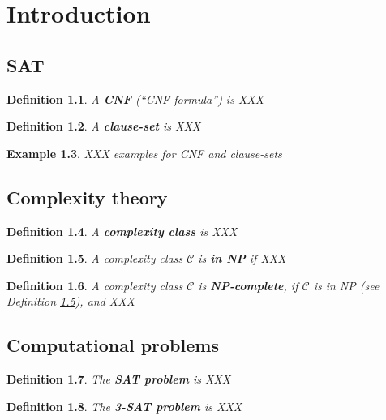 \documentclass[a4paper]{report}
\newtheorem{defi}{Definition}[section]
\newtheorem{examp}[defi]{Example}
\begin{document}
\chapter{Introduction}
\label{cha:Introduction}

\section{SAT}
\label{sec:BackgroundSAT}

\begin{defi}\label{def:CNF}
  A \textbf{CNF} (``CNF formula'') is XXX
\end{defi}

\begin{defi}\label{def:CLS}
  A \textbf{clause-set} is XXX
\end{defi}

\begin{examp}\label{exp:CLS}
  XXX examples for CNF and clause-sets
\end{examp}


\section{Complexity theory}
\label{sec:basicscomplexitytheory}

\begin{defi}\label{def:complexityclass}
  A \textbf{complexity class} is XXX
\end{defi}

\begin{defi}\label{def:inNP}
  A complexity class $\mathcal{C}$ is \textbf{in NP} if XXX
\end{defi}

\begin{defi}\label{def:NPcomplete}
  A complexity class $\mathcal{C}$ is \textbf{NP-complete}, if $\mathcal{C}$ is in NP (see Definition \ref{def:inNP}), and XXX
\end{defi}


\section{Computational problems}
\label{sec:computationalproblems}

\begin{defi}\label{def:SATproblem}
  The \textbf{SAT problem} is XXX
\end{defi}

\begin{defi}\label{def:3SATproblem}
  The \textbf{3-SAT problem} is XXX
\end{defi}
\end{document}
